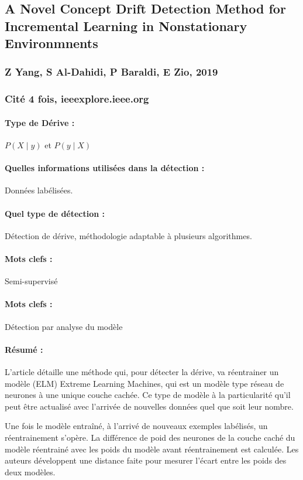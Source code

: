 \documentclass[11pt,a4paper]{report}
\begin{document}
\subsection{A Novel Concept Drift Detection Method for Incremental Learning in Nonstationary Environmnents}
\subsubsection{Z Yang, S Al-Dahidi, P Baraldi, E Zio, 2019}

\subsubsection{Cité 4 fois, ieeexplore.ieee.org}

\paragraph{Type de Dérive :} $P(X\mid y)$ et $P(y \mid X)$
\paragraph{Quelles informations utilisées dans la détection :} Données labélisées.
\paragraph{Quel type de détection :} Détection de dérive, méthodologie adaptable à plusieurs algorithmes.
\paragraph{Mots clefs :} Semi-supervisé

\paragraph{Mots clefs :} Détection par analyse du modèle

\paragraph{Résumé :} L'article détaille une méthode qui, pour détecter la dérive, va réentrainer un modèle (ELM) Extreme Learning Machines, qui est un modèle type réseau de neurones à une unique couche cachée. Ce type de modèle à la particularité qu'il peut être actualisé avec l'arrivée de nouvelles données quel que soit leur nombre.

Une fois le modèle entraîné, à l'arrivé de nouveaux exemples labélisés, un réentrainement s'opère. La différence de poid des neurones de la couche caché du modèle réentrainé avec les poids du modèle avant réentrainement est calculée. Les auteurs développent une distance faite pour mesurer l'écart entre les poids des deux modèles.
\end{document}
